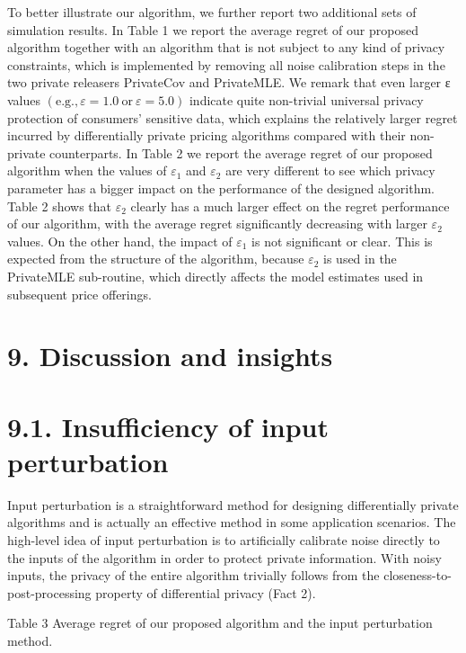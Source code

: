 To better illustrate our algorithm, we further report two additional sets of simulation results. In Table 1 we report the average regret of our proposed algorithm together with an algorithm that is not subject to any kind of privacy constraints, which is implemented by removing all noise calibration steps in the two private releasers PrivateCov and PrivateMLE. We remark that even larger ε values \(( \mathrm { e . g . } , \varepsilon = 1 . 0 \ \mathrm { o r } \ \varepsilon = 5 . 0 )\) indicate quite non-trivial universal privacy protection of consumers' sensitive data, which explains the relatively larger regret incurred by differentially private pricing algorithms compared with their non-private counterparts. In Table 2 we report the average regret of our proposed algorithm when the values of \(\varepsilon _ { 1 }\) and \(\varepsilon _ { 2 }\) are very different to see which privacy parameter has a bigger impact on the performance of the designed algorithm. Table 2 shows that \(\varepsilon _ { 2 }\) clearly has a much larger effect on the regret performance of our algorithm, with the average regret significantly decreasing with larger \(\varepsilon _ { 2 }\) values. On the other hand, the impact of \(\varepsilon _ { 1 }\) is not significant or clear. This is expected from the structure of the algorithm, because \(\varepsilon _ { 2 }\) is used in the PrivateMLE sub-routine, which directly affects the model estimates used in subsequent price offerings.

\section{9. Discussion and insights}\label{discussion-and-insights}

\section{9.1. Insufficiency of input perturbation}\label{insufficiency-of-input-perturbation}

Input perturbation is a straightforward method for designing differentially private algorithms and is actually an effective method in some application scenarios. The high-level idea of input perturbation is to artificially calibrate noise directly to the inputs of the algorithm in order to protect private information. With noisy inputs, the privacy of the entire algorithm trivially follows from the closeness-to-post-processing property of differential privacy (Fact 2).

Table 3 Average regret of our proposed algorithm and the input perturbation method.

